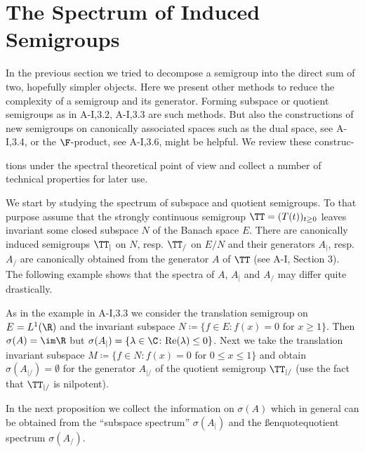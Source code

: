 \section{The Spectrum of Induced Semigroups}\label{sec:a3-4}

In the previous section we tried to decompose a semigroup into the direct sum of two, hopefully simpler objects.
Here we present other methods to reduce the complexity of a semigroup and its generator.
Forming subspace or quotient semigroups as in A-I,3.2, A-I,3.3 are such methods.
But also the constructions of new semigroups on canonically associated spaces such as the dual space, see A-I,3.4, or the $\F$-product, see A-I,3.6, might be helpful.
We review these construc-



tions under the spectral theoretical point of view and collect a number of technical properties for later use.

We start by studying the spectrum of subspace and quotient semigroups.
To that purpose assume that the strongly continuous semigroup $\TT = (T(t))_{t \geq 0}$ leaves invariant some closed subspace $N$ of the Banach space $E$.
There are canonically induced semigroups $\TT_{|}$ on $N$, resp. $\TT_{/}$ on $E/N$ and their generators $A_{|}$, resp. $A_{/}$ are canonically obtained from the generator $A$ of $\TT$ (see A-I, Section 3).
The following example shows that the spectra of $A$, $A_{|}$ and $A_{/}$ may differ quite drastically.

\begin{example}\label{ex:a3-4.1}

As in the example in A-I,3.3 we consider the translation semigroup on $E = L^{1}(\R)$ and the invariant subspace $N \coloneqq \{f \in E \colon f(x) = 0 \text{ for } x \geq 1\}$.
Then $\sigma(A) = \im\R$ but $\sigma(A_{|}) = \{\lambda \in \C \colon \text{Re}(\lambda) \leq 0\}$.
Next we take the translation invariant subspace $M \coloneqq \{f \in N \colon f(x) = 0 \text{ for } 0 \leq x \leq 1\}$ and obtain $\sigma(A_{|/}) = \emptyset$ for the generator $A_{|/}$ of the quotient semigroup $\TT_{|/}$ (use the fact that $\TT_{|/}$ is nilpotent).
\end{example}

In the next proposition we collect the information on $\sigma(A)$ which in general can be obtained from the \enquote{subspace spectrum} $\sigma(A_{|})$ and the ßenquote{quotient spectrum} $\sigma(A_{/})$.

